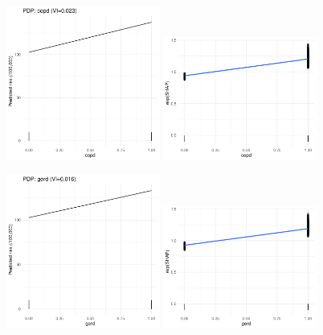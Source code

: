 \documentclass[12pt]{article}
\begin{document}
\begin{figure}[h]
\centering
\includegraphics[width=0.45\textwidth]{figures/pdp_new/copd.pdf}
\includegraphics[width=0.45\textwidth]{figures/shap_new/copd.pdf}
\end{figure}
\begin{figure}[h]
\centering
\includegraphics[width=0.45\textwidth]{figures/pdp_new/gerd.pdf}
\includegraphics[width=0.45\textwidth]{figures/shap_new/gerd.pdf}
\end{figure}
\end{document}
